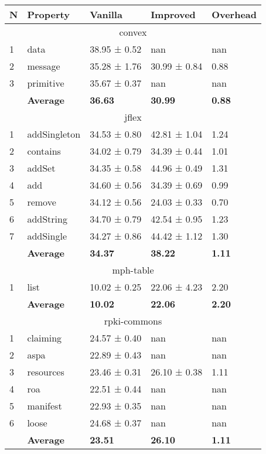 \begin{tabular}{lllll}
N & Property & Vanilla & Improved & Overhead \\
\hline
\multicolumn{5}{c}{convex} \\
\hline
1 & data & 38.95 ± 0.52 & nan & nan \\
2 & message & 35.28 ± 1.76 & 30.99 ± 0.84 & 0.88 \\
3 & primitive & 35.67 ± 0.37 & nan & nan \\
\textbf{} & \textbf{Average} & \textbf{36.63} & \textbf{30.99} & \textbf{0.88} \\
\hline
\multicolumn{5}{c}{jflex} \\
\hline
1 & addSingleton & 34.53 ± 0.80 & 42.81 ± 1.04 & 1.24 \\
2 & contains & 34.02 ± 0.79 & 34.39 ± 0.44 & 1.01 \\
3 & addSet & 34.35 ± 0.58 & 44.96 ± 0.49 & 1.31 \\
4 & add & 34.60 ± 0.56 & 34.39 ± 0.69 & 0.99 \\
5 & remove & 34.12 ± 0.56 & 24.03 ± 0.33 & 0.70 \\
6 & addString & 34.70 ± 0.79 & 42.54 ± 0.95 & 1.23 \\
7 & addSingle & 34.27 ± 0.86 & 44.42 ± 1.12 & 1.30 \\
\textbf{} & \textbf{Average} & \textbf{34.37} & \textbf{38.22} & \textbf{1.11} \\
\hline
\multicolumn{5}{c}{mph-table} \\
\hline
1 & list & 10.02 ± 0.25 & 22.06 ± 4.23 & 2.20 \\
\textbf{} & \textbf{Average} & \textbf{10.02} & \textbf{22.06} & \textbf{2.20} \\
\hline
\multicolumn{5}{c}{rpki-commons} \\
\hline
1 & claiming & 24.57 ± 0.40 & nan & nan \\
2 & aspa & 22.89 ± 0.43 & nan & nan \\
3 & resources & 23.46 ± 0.31 & 26.10 ± 0.38 & 1.11 \\
4 & roa & 22.51 ± 0.44 & nan & nan \\
5 & manifest & 22.93 ± 0.35 & nan & nan \\
6 & loose & 24.68 ± 0.37 & nan & nan \\
\textbf{} & \textbf{Average} & \textbf{23.51} & \textbf{26.10} & \textbf{1.11} \\
\end{tabular}
